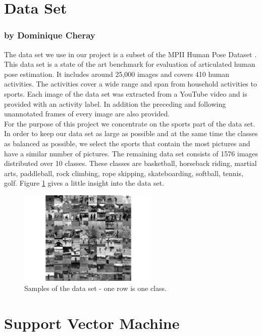 \documentclass[11pt]{report}
\begin{document}
\section{Data Set}
\label{dataset}
\subsubsection{by Dominique Cheray}
The data set we use in our project is a subset of the MPII Human Pose Dataset
\cite{andriluka20142d}. This data set is a state of the art benchmark for
evaluation of articulated human pose estimation. It includes around
25,000 images and covers 410 human activities. The activities cover a wide range
and span from household activities to sports. Each image
of the data set was extracted from a YouTube video and is provided with an
activity label. In addition the preceding and following unannotated frames of
every image are also provided. \\
For the purpose of this project we concentrate on the sports part of the
data set. In order to keep our data set as large as possible and at the same
time the classes as balanced as possible, we select the sports that contain the most
pictures and have a similar number of pictures. The remaining data set consists of
1576 images distributed over 10 classes. These classes are basketball, horseback
riding, martial arts, paddleball, rock climbing, rope skipping, skateboarding,
softball, tennis, golf. Figure \ref{plotgrid} gives a little insight into the
data set. 
\begin{figure}
  \centering
  \includegraphics[width=0.6\textwidth]{plotgrid}
  \caption{Samples of the data set - one row is one class.}
  \label{plotgrid}
\end{figure}

\section {Support Vector Machine}
\label{SVM}
\end{document}
